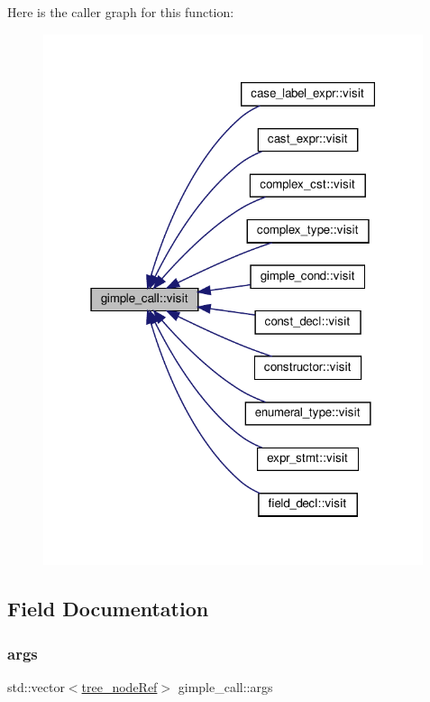 Here is the caller graph for this function\+:
\nopagebreak
\begin{figure}[H]
\begin{center}
\leavevmode
\includegraphics[width=316pt]{dc/d76/structgimple__call_ab493870aac4460fe2d52315b61ee5992_icgraph}
\end{center}
\end{figure}


\subsection{Field Documentation}
\mbox{\label{structgimple__call_a43dc4a5085f0b928b92f1d3b2bd529a2}} 
\subsubsection{\texorpdfstring{args}{args}}
{\footnotesize\ttfamily std\+::vector$<$\hyperlink{tree__node_8hpp_a6ee377554d1c4871ad66a337eaa67fd5}{tree\+\_\+node\+Ref}$>$ gimple\+\_\+call\+::args}



